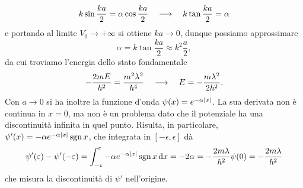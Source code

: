 \begin{equation}
	k\sin\frac{ka}2=\alpha\cos\frac{ka}2\quad\longrightarrow\quad k\tan\frac{ka}2=\alpha
	\label{eq:condizione-C1-delta-attrattivo}
\end{equation}
e portando al limite $V_0\to+\infty$ si ottiene $ka\to 0$, dunque possiamo approssimare
\begin{equation}
	\alpha=k\tan\frac{ka}2\approx k^2\frac{a}2,
\end{equation}
da cui troviamo l'energia dello stato fondamentale
\begin{equation}
	-\frac{2mE}{\hbar^2}=\frac{m^2\lambda^2}{\hbar^4}\quad\longrightarrow\quad E=-\frac{m\lambda^2}{2\hbar^2}.
	\label{eq:E-fondamentale-delta-attrattivo}
\end{equation}
Con $a\to 0$ si ha inoltre la funzione d'onda $\psi(x)=e^{-\alpha\left|{x}\right|}$.
La sua derivata non è continua in $x=0$, ma non è un problema dato che il potenziale ha una discontinuità infinita in quel punto.
Risulta, in particolare, $\psi'(x)=-\alpha e^{-\alpha\left|{x}\right|}\operatorname{sgn} x$, che integrata in $[-\epsilon,\epsilon]$ dà
\begin{equation}
	\psi'(\varepsilon)-\psi'(-\varepsilon)=\int_{-\varepsilon}^{\varepsilon}-\alpha e^{-\alpha\left|{x}\right|}\operatorname{sgn} x\,\textup{d} x=-2\alpha=-\frac{2m\lambda}{\hbar^2}\psi(0)=-\frac{2m\lambda}{\hbar^2}
	\label{eq:discontinuita-derivata-wf-delta-attrattivo}
\end{equation}
che misura la discontinuità di $\psi'$ nell'origine.


